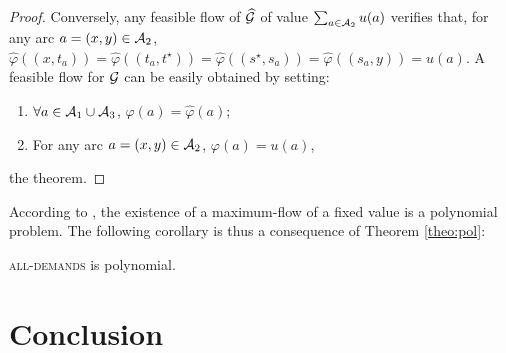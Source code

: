 \begin{bibunit}[ieeetr]
\begin{proof}
Conversely, any feasible flow of $\widehat{\mathcal{G}}$ of value $\sum_{a\in \mathcal{A}_2} u(a)$ verifies
that, for any arc $a=(x,y)\in \mathcal{A}_2$, 
$\widehat{\varphi}((x,t_a))=\widehat{\varphi}((t_a,t^\star))=\widehat{\varphi}((s^\star, s_a))=\widehat{\varphi}( (s_a,y))=u(a)$.
A feasible flow for ${\mathcal{G}}$ can be easily obtained by setting:
\begin{enumerate}
\item
$\forall a\in \mathcal{A}_1 \cup \mathcal{A}_3$, 
${\varphi}(a)=\widehat{\varphi}(a)$;
\item
For any arc $a=(x,y)\in \mathcal{A}_2$, $\varphi(a)=u(a)$,
\end{enumerate}
the theorem.
\end{proof}

According to \cite{ahuja1993}, the existence of a maximum-flow of a fixed value is a polynomial problem. The following corollary is thus a consequence
of Theorem \ref{theo:pol}:
\begin{corollary}
\textsc{all-demands} is polynomial.
\end{corollary}

\section{Conclusion}

\newpage
{}
\renewcommand{\bibname}{Bibliography of chapter \thechapter}
\end{bibunit}
